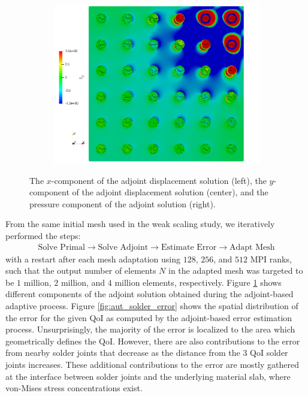 \begin{figure}[ht!]
\begin{subfigure}{0.33\textwidth}
\includegraphics[width=.99\linewidth]{img/aut_solder_zp.png}
\end{subfigure}
\caption{The $x$-component of the adjoint displacement solution
(left), the $y$-component of the adjoint displacement solution
(center), and the pressure component of the adjoint solution
(right).}
\label{fig:aut_solder_adjoint}
\end{figure}

From the same initial mesh used in the weak scaling study,
we iteratively performed the steps:
%
\begin{gather*}
\text{Solve Primal} \rightarrow \text{Solve Adjoint} \rightarrow
\text{Estimate Error} \rightarrow \text{Adapt Mesh}
\end{gather*}
%
with a restart after each mesh adaptation using $128$,
$256$, and $512$ MPI ranks, such that the output number
of elements $N$ in the adapted mesh was targeted to be
$1$ million, $2$ million, and $4$ million elements,
respectively. Figure \ref{fig:aut_solder_adjoint} shows
different components of the adjoint solution obtained
during the adjoint-based adaptive process.
Figure \ref{fig:aut_solder_error} shows
the spatial distribution of the error for the given
QoI as computed by the adjoint-based error estimation process.
Unsurprisingly, the majority of the error is localized to the
area which geometrically defines the QoI. However, there are
also contributions to the error from nearby solder joints that
decrease as the distance from the 3 QoI solder joints
increases. These additional contributions to the error
are mostly gathered at the interface between solder
joints and the underlying material slab, where von-Mises
stress concentrations exist.

